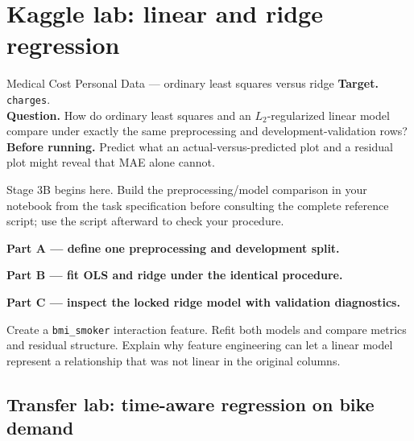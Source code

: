 \section{Kaggle lab: linear and ridge regression}
\label{sec:kaggle-insurance-regression}

\begin{kaggleproject}{Medical Cost Personal Data --- ordinary least squares versus ridge}
\textbf{Target.} \texttt{charges}.\\
\textbf{Question.} How do ordinary least squares and an $L_2$-regularized linear model compare under exactly the same preprocessing and development-validation rows?\\
\textbf{Before running.} Predict what an actual-versus-predicted plot and a residual plot might reveal that MAE alone cannot.

\begin{labmode}
Stage 3B begins here. Build the preprocessing/model comparison in your notebook from the task specification before consulting the complete reference script; use the script afterward to check your procedure.
\end{labmode}

\textbf{Part A --- define one preprocessing and development split.}



\textbf{Part B --- fit OLS and ridge under the identical procedure.}



\textbf{Part C --- inspect the locked ridge model with validation diagnostics.}



\begin{tryit}
Create a \texttt{bmi\_smoker} interaction feature. Refit both models and compare metrics and residual structure. Explain why feature engineering can let a linear model represent a relationship that was not linear in the original columns.
\end{tryit}
\end{kaggleproject}

\subsection{Transfer lab: time-aware regression on bike demand}

